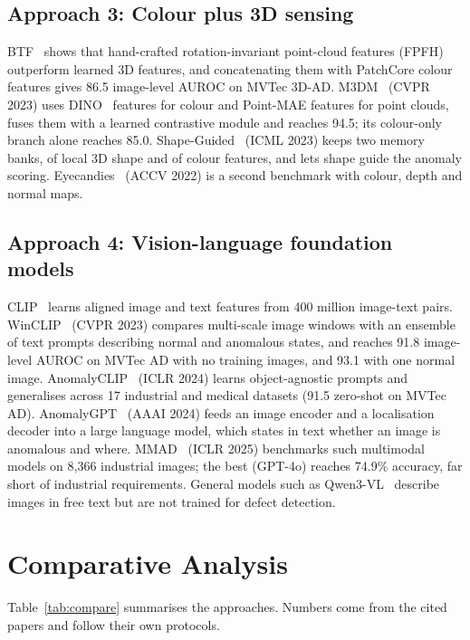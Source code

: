 \documentclass[conference]{IEEEtran}
\begin{document}
\subsection{Approach 3: Colour plus 3D sensing}
BTF~\cite{btf} shows that hand-crafted rotation-invariant point-cloud features (FPFH) outperform learned 3D features, and concatenating them with PatchCore colour features gives 86.5 image-level AUROC on MVTec 3D-AD. M3DM~\cite{m3dm} (CVPR 2023) uses DINO~\cite{dino} features for colour and Point-MAE features for point clouds, fuses them with a learned contrastive module and reaches 94.5; its colour-only branch alone reaches 85.0. Shape-Guided~\cite{shapeguided} (ICML 2023) keeps two memory banks, of local 3D shape and of colour features, and lets shape guide the anomaly scoring. Eyecandies~\cite{eyecandies} (ACCV 2022) is a second benchmark with colour, depth and normal maps.

\subsection{Approach 4: Vision-language foundation models}
CLIP~\cite{clip} learns aligned image and text features from 400 million image-text pairs. WinCLIP~\cite{winclip} (CVPR 2023) compares multi-scale image windows with an ensemble of text prompts describing normal and anomalous states, and reaches 91.8 image-level AUROC on MVTec AD with no training images, and 93.1 with one normal image. AnomalyCLIP~\cite{anomalyclip} (ICLR 2024) learns object-agnostic prompts and generalises across 17 industrial and medical datasets (91.5 zero-shot on MVTec AD). AnomalyGPT~\cite{anomalygpt} (AAAI 2024) feeds an image encoder and a localisation decoder into a large language model, which states in text whether an image is anomalous and where. MMAD~\cite{mmad} (ICLR 2025) benchmarks such multimodal models on 8,366 industrial images; the best (GPT-4o) reaches 74.9\% accuracy, far short of industrial requirements. General models such as Qwen3-VL~\cite{qwen3vl} describe images in free text but are not trained for defect detection.

\section{Comparative Analysis}
Table~\ref{tab:compare} summarises the approaches. Numbers come from the cited papers and follow their own protocols.
\end{document}
